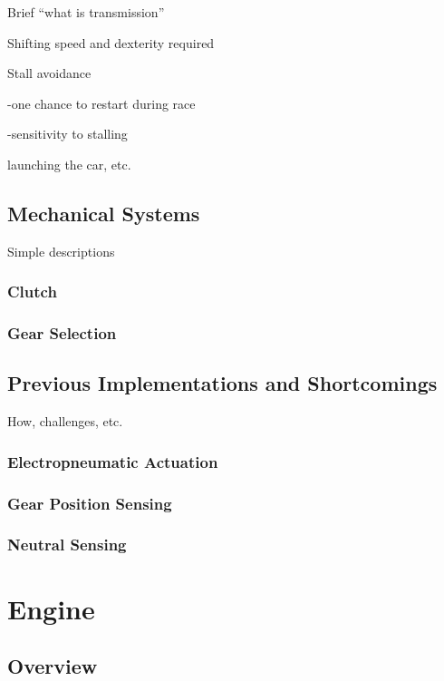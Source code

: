 Brief {}``what is transmission''

Shifting speed and dexterity required

Stall avoidance

-one chance to restart during race

-sensitivity to stalling

launching the car, etc.


\subsection{Mechanical Systems}

Simple descriptions


\subsubsection{Clutch}


\subsubsection{Gear Selection}


\subsection{Previous Implementations and Shortcomings}

How, challenges, etc.


\subsubsection{Electropneumatic Actuation}


\subsubsection{Gear Position Sensing}


\subsubsection{Neutral Sensing}


\section{Engine}


\subsection{Overview}

